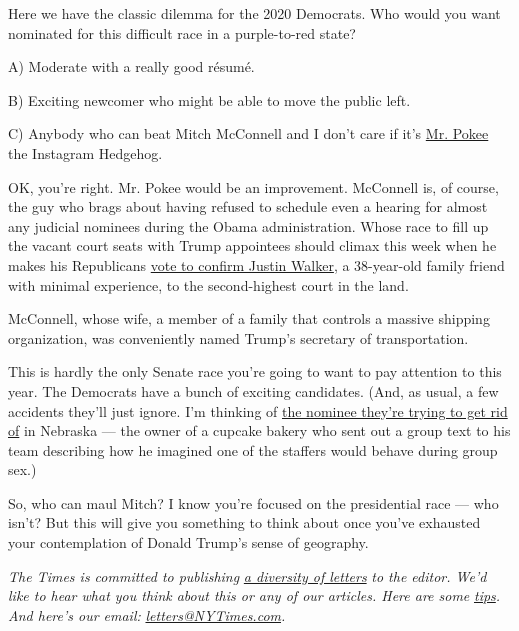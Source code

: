 Here we have the classic dilemma for the 2020 Democrats. Who would you
want nominated for this difficult race in a purple-to-red state?

A) Moderate with a really good résumé.

B) Exciting newcomer who might be able to move the public left.

C) Anybody who can beat Mitch McConnell and I don't care if it's
\href{https://www.instagram.com/mr.pokee/?hl=en}{Mr. Pokee} the
Instagram Hedgehog.

OK, you're right. Mr. Pokee would be an improvement. McConnell is, of
course, the guy who brags about having refused to schedule even a
hearing for almost any judicial nominees during the Obama
administration. Whose race to fill up the vacant court seats with Trump
appointees should climax this week when he makes his Republicans
\href{https://www.nytimes3xbfgragh.onion/2020/06/04/us/judge-justin-walker-nomination-senate.html}{vote
to confirm Justin Walker}, a 38-year-old family friend with minimal
experience, to the second-highest court in the land.

McConnell, whose wife, a member of a family that controls a massive
shipping organization, was conveniently named Trump's secretary of
transportation.

This is hardly the only Senate race you're going to want to pay
attention to this year. The Democrats have a bunch of exciting
candidates. (And, as usual, a few accidents they'll just ignore. I'm
thinking of
\href{https://www.nytimes3xbfgragh.onion/2020/06/16/us/politics/chris-janicek-nebraska-senate.html}{the
nominee they're trying to get rid of} in Nebraska --- the owner of a
cupcake bakery who sent out a group text to his team describing how he
imagined one of the staffers would behave during group sex.)

So, who can maul Mitch? I know you're focused on the presidential race
--- who isn't? But this will give you something to think about once
you've exhausted your contemplation of Donald Trump's sense of
geography.

\emph{The Times is committed to publishing}
\href{https://www.nytimes3xbfgragh.onion/2019/01/31/opinion/letters/letters-to-editor-new-york-times-women.html}{\emph{a
diversity of letters}} \emph{to the editor. We'd like to hear what you
think about this or any of our articles. Here are some}
\href{https://help.nytimes3xbfgragh.onion/hc/en-us/articles/115014925288-How-to-submit-a-letter-to-the-editor}{\emph{tips}}\emph{.
And here's our email:}
\href{mailto:letters@NYTimes.com}{\emph{letters@NYTimes.com}}\emph{.}

